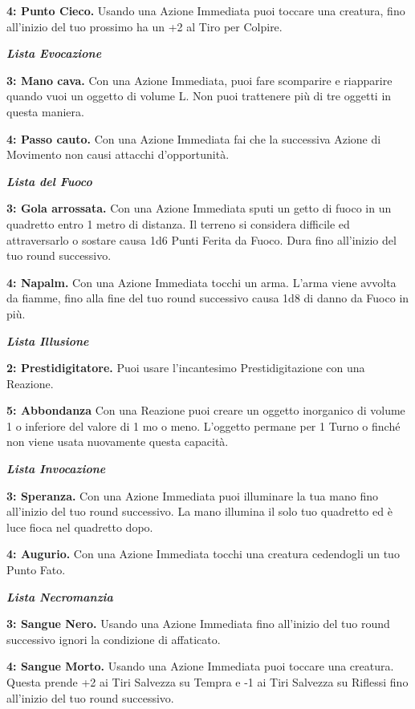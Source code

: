 \begin{multicols}{2}
\textbf{4: Punto Cieco.} Usando una Azione Immediata puoi toccare una creatura, fino all'inizio del tuo prossimo ha un +2 al Tiro per Colpire.

\emph{\textbf{Lista Evocazione}}

\textbf{3: Mano cava.} Con una Azione Immediata, puoi fare scomparire e riapparire quando vuoi un oggetto di volume L. Non puoi trattenere più di tre oggetti in questa maniera.

\textbf{4: Passo cauto.} Con una Azione Immediata fai che la successiva Azione di Movimento non causi attacchi d'opportunità.

\emph{\textbf{Lista del Fuoco}}

\textbf{3: Gola arrossata.} Con una Azione Immediata sputi un getto di fuoco in un quadretto entro 1 metro di distanza. Il terreno si considera difficile ed attraversarlo o sostare causa 1d6 Punti Ferita da Fuoco. Dura fino all'inizio del tuo round successivo.

\textbf{4: Napalm.} Con una Azione Immediata tocchi un arma. L'arma viene avvolta da fiamme, fino alla fine del tuo round successivo causa 1d8 di danno da Fuoco in più.

\emph{\textbf{Lista Illusione}}

\textbf{2: Prestidigitatore.} Puoi usare l'incantesimo Prestidigitazione con una Reazione.

\textbf{5: Abbondanza} Con una Reazione puoi creare un oggetto inorganico di volume 1 o inferiore del valore di 1 mo o meno. L'oggetto permane per 1 Turno o finché non viene usata nuovamente questa capacità.

\emph{\textbf{Lista Invocazione}}

\textbf{3: Speranza.} Con una Azione Immediata puoi illuminare la tua mano fino all'inizio del tuo round successivo. La mano illumina il solo tuo quadretto ed è luce fioca nel quadretto dopo.

\textbf{4: Augurio.} Con una Azione Immediata tocchi una creatura cedendogli un tuo Punto Fato.

\emph{\textbf{Lista Necromanzia}}

\textbf{3: Sangue Nero.} Usando una Azione Immediata fino all'inizio del tuo round successivo ignori la condizione di affaticato.

\textbf{4: Sangue Morto.} Usando una Azione Immediata puoi toccare una creatura. Questa prende +2 ai Tiri Salvezza su Tempra e -1 ai Tiri Salvezza su Riflessi fino all'inizio del tuo round successivo.


\end{multicols}
